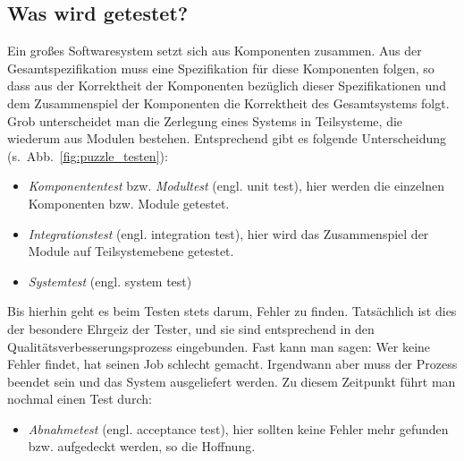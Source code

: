 \subsection{Was wird getestet?}
\label{sec:Kap-11-1-2}

Ein großes Softwaresystem setzt sich aus Komponenten zusammen. Aus der Gesamt\-spe\-zi\-fi\-ka\-tion muss eine Spezifikation für diese Komponenten folgen, so dass aus der Korrektheit der Komponenten bezüglich dieser Spezifikationen und dem Zusammenspiel der Komponenten die Korrektheit des Gesamtsystems folgt. Grob unterscheidet man die Zerlegung eines Systems in Teilsysteme, die wiederum aus Modulen bestehen. Entsprechend gibt es folgende Unterscheidung (s.~Abb.~\ref{fig:puzzle_testen}):


\begin{itemize}
	\item \textit{Komponententest} bzw. \textit{Modultest} (engl. unit test), 
	hier werden die einzelnen Komponenten bzw. Module getestet.
	\item \textit{Integrationstest} (engl. integration test), 
	hier wird das Zusammenspiel der 
	\linebreak %
	Module auf Teilsystemebene getestet.
	\item \textit{Systemtest} (engl. system test)
\end{itemize}

Bis hierhin geht es beim Testen stets darum, Fehler zu finden. Tatsächlich ist dies der besondere Ehrgeiz der Tester, und sie sind entsprechend in den Qualitäts\-verbesserungs\-prozess eingebunden. Fast kann man sagen: Wer keine Fehler findet, hat seinen Job schlecht gemacht. Irgendwann aber muss der Prozess beendet sein und das System ausgeliefert werden. Zu diesem Zeitpunkt führt man nochmal einen Test durch:

\begin{itemize}
	\item \textit{Abnahmetest} (engl. acceptance test), 
	hier sollten keine Fehler mehr gefunden bzw. aufgedeckt werden, so die Hoffnung.
\end{itemize}

